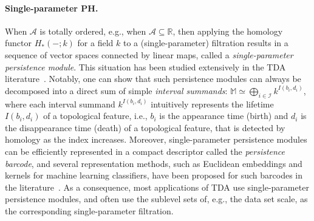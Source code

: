 \documentclass{article}
\newcommand{\field}{k}
\newcommand{\interval}{I}
\newcommand{\R}{\mathbb{R}}
\newcommand{\M}{{\mathbb M}}
\newcommand{\rebuttal}[1]{{ #1}}
\begin{document}
\paragraph*{Single-parameter PH.} 
When $\mathcal A$ is totally ordered, e.g., when $\mathcal A\subseteq \R$,
then applying the homology functor $H_*(-;\field)$ for a field $\field$ to a (single-parameter) filtration 
results in a sequence of vector spaces 
connected by linear maps, called a {\em single-parameter persistence module}.  This situation has been studied extensively
in the TDA literature~\cite{carlssonTopologyData2009, Chazal2016, edelsbrunnerComputationalTopologyIntroduction2010, oudotPersistenceTheoryQuiver2015}. 
Notably, one can show that such 
persistence modules can always be decomposed into a direct sum of simple {\em interval summands}: $\M\simeq \bigoplus_{i\in \mathcal I} \rebuttal{\field^{\interval(b_i,d_i)}}$, where
each interval summand \rebuttal{$\field^{\interval(b_i,d_i)}$}
intuitively represents the lifetime \rebuttal{$\interval(b_i,d_i)$} of a topological \rebuttal{feature}, i.e., $b_i$ is the appearance time (birth) and $d_i$ is the disappearance time (death) of  a
topological \rebuttal{feature}, that is detected by 
homology as the index increases. Moreover, single-parameter persistence modules can be efficiently represented in a compact descriptor 
called the {\em persistence barcode}, and several representation methods, such as Euclidean embeddings and kernels for machine learning classifiers, have been
proposed for such barcodes in the literature~\cite{bubenikStatisticalTopologicalData2015, adamsPersistenceImagesStable2017, reininghausStableMultiscaleKernel2015, carriereSlicedWassersteinKernel2017, carrierePersLayNeuralNetwork2020}.  As a consequence, most applications of 
TDA use single-parameter persistence modules, and often use the sublevel sets of, e.g., the data set scale,
as the corresponding single-parameter filtration.
\end{document}
